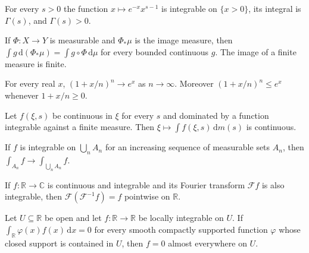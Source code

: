 \begin{theorem}\label{thm:std_gamma}
\mathlibok
For every $s > 0$ the function $x \mapsto e^{-x} x^{s-1}$ is integrable on $\{x > 0\}$, its integral is $\Gamma(s)$, and $\Gamma(s) > 0$.
\end{theorem}

\begin{theorem}\label{thm:std_image_measure}
\mathlibok
If $\Phi : X \to Y$ is measurable and $\Phi_* \mu$ is the image measure, then $\int g \, \mathrm{d}(\Phi_* \mu) = \int g \circ \Phi \, \mathrm{d}\mu$ for every bounded continuous $g$. The image of a finite measure is finite.
\end{theorem}

\begin{theorem}\label{thm:std_exp_limit}
\mathlibok
For every real $x$, $(1 + x/n)^n \to e^x$ as $n \to \infty$. Moreover $(1 + x/n)^n \le e^x$ whenever $1 + x/n \ge 0$.
\end{theorem}

\begin{theorem}\label{thm:std_continuity_integral}
\mathlibok
Let $f(\xi, s)$ be continuous in $\xi$ for every $s$ and dominated by a function integrable against a finite measure. Then $\xi \mapsto \int f(\xi, s)\, \mathrm{d}m(s)$ is continuous.
\end{theorem}

\begin{theorem}\label{thm:std_exhaustion}
\mathlibok
If $f$ is integrable on $\bigcup_n A_n$ for an increasing sequence of measurable sets $A_n$, then $\int_{A_n} f \to \int_{\bigcup_n A_n} f$.
\end{theorem}

\begin{theorem}\label{thm:std_fourier_inversion}
\mathlibok
If $f : \mathbb{R} \to \mathbb{C}$ is continuous and integrable and its Fourier transform $\mathcal{F} f$ is also integrable, then $\mathcal{F}(\mathcal{F}^{-1} f) = f$ pointwise on $\mathbb{R}$.
\end{theorem}

\begin{theorem}\label{thm:std_du_bois_reymond}
\mathlibok
Let $U \subseteq \mathbb{R}$ be open and let $f : \mathbb{R} \to \mathbb{R}$ be locally integrable on $U$. If $\int_{\mathbb{R}} \varphi(x) f(x) \, \mathrm{d}x = 0$ for every smooth compactly supported function $\varphi$ whose closed support is contained in $U$, then $f = 0$ almost everywhere on $U$.
\end{theorem}

